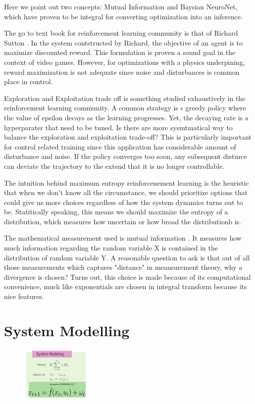 \documentclass[journal]{IEEEtran}
\begin{document}
Here we point out two concepts: Mutual Information and Baysian NeuroNet, which have proven to be integral for converting optimization into an inference.

The go to text book for reinforcement learning community is that of Richard Sutton \cite{Sutton1998IntroductionTR}. In the system contstructed by Richard, the objective of an agent is to maximize discounted reward. This formulation is proven a sound goal in the context of video games. However, for optimizations with a physics underpining, reward maximization is not adequate since noise and disturbances is common place in control.

Exploration and Exploitation trade off is something studied exhaustively in the reinforcement learning community. A common strategy is $\epsilon$ greedy policy where the value of epsilon decays as the learning progresses. Yet, the decaying rate is a hyperparater that need to be tuned. Is there are more sysmtmatical way to balance the exploration and exploitation trade-off? This is particularly important for control related training since this application has considerable amount of disturbance and noise. If the policy converges too soon, any subsequent disturce can deviate the trajectory to the extend that it is no longer controllable.

The intuition behind maximum entropy reinforcenement learning is the heuristic that when we don't know all the circumstance, we should prioritize options that could give us more choices regardless of how the system dynamics turns out to be. Statitically speaking, this means we should maximize the entropy of a distribution, which measures how uncertain or how broad the distributionb is.

The mathematical measurement used is mutual information \cite{Kullback1951ONIA}. It measures how much information regarding the random variable X is contained in the distribution of random variable Y. A reasonable question to ask is that out of all those measurements which captures "distance" in meansurement theory, why a divergence is chosen? Turns out, this choice is made because of its computational convenience, much like exponentials are chosen in integral transform because its nice features.



\section{System Modelling}
\begin{figure}[H]
    \centering
    \includegraphics[width=0.3\textwidth]{Control1.png}
\end{figure}
\end{document}
